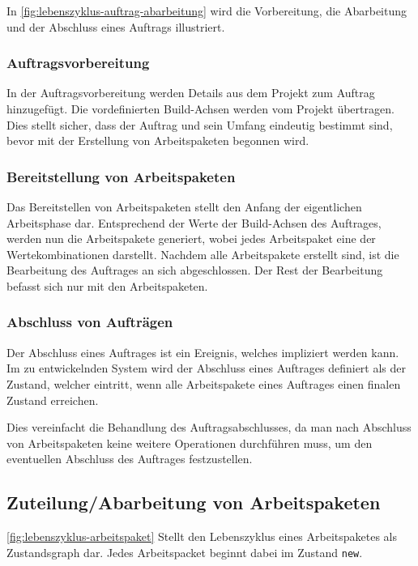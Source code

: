 In \cref{fig:lebenszyklus-auftrag-abarbeitung} wird die Vorbereitung, die Abarbeitung und der Abschluss eines Auftrags illustriert.


\subsubsection{Auftragsvorbereitung}

In der Auftragsvorbereitung werden Details aus dem Projekt zum Auftrag hinzugefügt.
Die vordefinierten Build-Achsen werden vom Projekt übertragen.
Dies stellt sicher, dass der Auftrag und sein Umfang eindeutig bestimmt sind,
bevor mit der Erstellung von Arbeitspaketen begonnen wird.


\subsubsection{Bereitstellung von Arbeitspaketen}

Das Bereitstellen von Arbeitspaketen stellt den Anfang der eigentlichen Arbeitsphase dar.
Entsprechend der Werte der Build-Achsen des Auftrages, werden nun die Arbeits\-pakete generiert,
wobei jedes Arbeitspaket eine der Wertekombinationen darstellt.
Nachdem alle Arbeitspakete erstellt sind, ist die Bearbeitung des Auftrages an sich abgeschlossen. Der Rest der Bearbeitung befasst sich nur mit den Arbeitspaketen.

\subsubsection{Abschluss von Aufträgen}

Der Abschluss eines Auftrages ist ein Ereignis, welches impliziert werden kann.
Im zu entwickelnden System wird der Abschluss eines Auftrages definiert
als der Zustand, welcher eintritt, wenn alle Arbeitspakete eines Auftrages
einen finalen Zustand erreichen.

Dies vereinfacht die Behandlung des Auftragsabschlusses,
da man nach Abschluss von Arbeitspaketen keine weitere Operationen durchführen muss,
um den eventuellen Abschluss des Auftrages festzustellen.

\subsection{Zuteilung/Abarbeitung von Arbeitspaketen}

\cref{fig:lebenszyklus-arbeitspaket} Stellt den Lebenszyklus eines Arbeitspaketes als Zustandsgraph dar.
Jedes Arbeitspacket beginnt dabei im Zustand \verb|new|.


